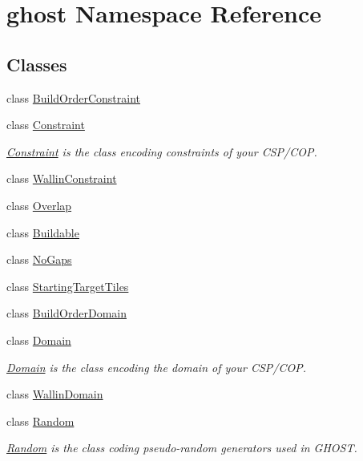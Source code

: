 \hypertarget{namespaceghost}{\section{ghost Namespace Reference}
\label{namespaceghost}
}
\subsection*{Classes}
\begin{DoxyCompactItemize}
\item 
class \hyperlink{classghost_1_1BuildOrderConstraint}{Build\-Order\-Constraint}
\item 
class \hyperlink{classghost_1_1Constraint}{Constraint}
\begin{DoxyCompactList}\small\item\em \hyperlink{classghost_1_1Constraint}{Constraint} is the class encoding constraints of your C\-S\-P/\-C\-O\-P. \end{DoxyCompactList}\item 
class \hyperlink{classghost_1_1WallinConstraint}{Wallin\-Constraint}
\item 
class \hyperlink{classghost_1_1Overlap}{Overlap}
\item 
class \hyperlink{classghost_1_1Buildable}{Buildable}
\item 
class \hyperlink{classghost_1_1NoGaps}{No\-Gaps}
\item 
class \hyperlink{classghost_1_1StartingTargetTiles}{Starting\-Target\-Tiles}
\item 
class \hyperlink{classghost_1_1BuildOrderDomain}{Build\-Order\-Domain}
\item 
class \hyperlink{classghost_1_1Domain}{Domain}
\begin{DoxyCompactList}\small\item\em \hyperlink{classghost_1_1Domain}{Domain} is the class encoding the domain of your C\-S\-P/\-C\-O\-P. \end{DoxyCompactList}\item 
class \hyperlink{classghost_1_1WallinDomain}{Wallin\-Domain}
\item 
class \hyperlink{classghost_1_1Random}{Random}
\begin{DoxyCompactList}\small\item\em \hyperlink{classghost_1_1Random}{Random} is the class coding pseudo-\/random generators used in G\-H\-O\-S\-T. \end{DoxyCompactList}\item 

\end{DoxyCompactItemize}
